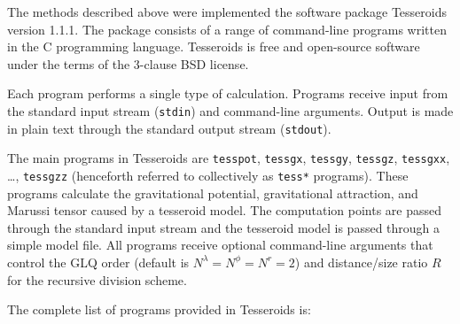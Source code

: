 \documentclass[extra]{gji}
\begin{document}
The methods described above
were implemented the software package
Tesseroids version 1.1.1.
The package consists
of a range of command-line programs
written in the C programming language.
Tesseroids is free and open-source software
under the terms of
the 3-clause BSD license.

Each program performs a single type of calculation.
Programs receive input from
the standard input stream (\texttt{stdin})
and command-line arguments.
Output is made in plain text
through the standard output stream (\texttt{stdout}).

The main programs in Tesseroids are
\texttt{tesspot},
\texttt{tessgx},
\texttt{tessgy},
\texttt{tessgz},
\texttt{tessgxx},
\ldots ,
\texttt{tessgzz}
(henceforth referred to collectively as \texttt{tess*} programs).
These programs
calculate the gravitational potential,
gravitational attraction,
and Marussi tensor
caused by a tesseroid model.
The computation points are passed
through the standard input stream
and the tesseroid model
is passed through
a simple model file.
All programs receive
optional command-line arguments
that control the GLQ order (default is $N^\lambda=N^\phi=N^r=2$)
and distance/size ratio $R$
for the recursive division scheme.

The complete list of programs provided in Tesseroids is:
\end{document}
